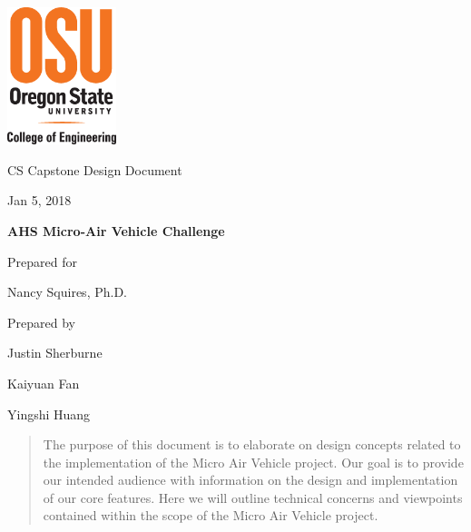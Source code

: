 \documentclass[onecolumn, draftclsnofoot,10pt, compsoc]{IEEEtran}
\def \GroupMemberOne{			Justin Sherburne}
\def \GroupMemberTwo{			Kaiyuan Fan}
\def \GroupMemberThree{			Yingshi Huang}
\def \CapstoneProjectName{		AHS Micro-Air Vehicle Challenge}
\def \CapstoneSponsorPerson{		Nancy Squires, Ph.D.}
\newcommand{\NameSigPair}[1]{\par
\makebox[2.75in][r]{#1} \hfil 	\makebox[3.25in]{\makebox[2.25in]{\hrulefill} \hfill		\makebox[.75in]{\hrulefill}}
\par\vspace{-12pt} \textit{\tiny\noindent
\makebox[2.75in]{} \hfil		\makebox[3.25in]{\makebox[2.25in][r]{Signature} \hfill	\makebox[.75in][r]{Date}}}}
\renewcommand{\NameSigPair}[1]{#1}
\begin{document}
\newpage
	\includegraphics[height=4cm]{coe_v_spot1}
        \hfill    
        \par\vspace{.5in}
        \begin{center}
        \begin{scshape}
            \huge CS Capstone Design Document \par
            {\large{Jan 5, 2018}}\par
            \vspace{8pt}
            \textbf{\Huge\CapstoneProjectName}\par
			\vspace{.5in}
                        {\large Prepared for}\par
            {\Large\NameSigPair{\CapstoneSponsorPerson}\par}
			\vspace{3pt}
            {\large Prepared by }\par
            \vspace{8pt}
            {\Large
                \NameSigPair{\GroupMemberOne}\par
                \NameSigPair{\GroupMemberTwo}\par
                \NameSigPair{\GroupMemberThree}\par
            }
            \vspace{.5in}
           \end{scshape}
        \begin{abstract}
        The purpose of this document is to elaborate on design concepts related to the implementation of the Micro Air Vehicle project. Our goal is to provide our intended audience with information on the design and implementation of our core features. Here we will outline technical concerns and viewpoints contained within the scope of the Micro Air Vehicle project. 
        \end{abstract}    
        \normalsize
\end{center}
\newpage
\end{document}
